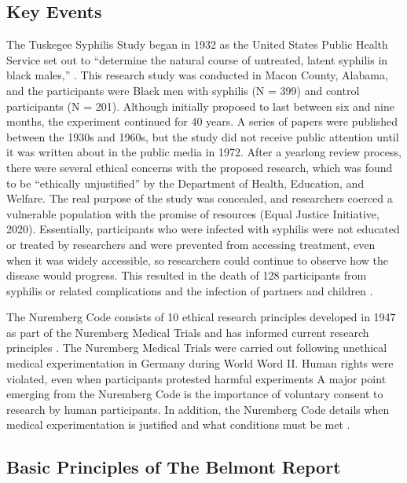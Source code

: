 \documentclass[
  11pt,
]{book}
\begin{document}
\subsection{Key Events}\label{key-events}

The Tuskegee Syphilis Study began in 1932 as the United States Public Health Service set out to ``determine the natural course of untreated, latent syphilis in black males,'' \citep[p.~21]{brandt_racism_1978}. This research study was conducted in Macon County, Alabama, and the participants were Black men with syphilis (N = 399) and control participants (N = 201). Although initially proposed to last between six and nine months, the experiment continued for 40 years. A series of papers were published between the 1930s and 1960s, but the study did not receive public attention until it was written about in the public media in 1972. After a yearlong review process, there were several ethical concerns with the proposed research, which was found to be ``ethically unjustified'' by the Department of Health, Education, and Welfare. The real purpose of the study was concealed, and researchers coerced a vulnerable population with the promise of resources (Equal Justice Initiative, 2020). Essentially, participants who were infected with syphilis were not educated or treated by researchers and were prevented from accessing treatment, even when it was widely accessible, so researchers could continue to observe how the disease would progress. This resulted in the death of 128 participants from syphilis or related complications and the infection of partners and children \citep{equal_justice_institute_tuskegee_2020}.

The Nuremberg Code consists of 10 ethical research principles developed in 1947 as part of the Nuremberg Medical Trials and has informed current research principles \citep{shuster_fifty_1997}. The Nuremberg Medical Trials were carried out following unethical medical experimentation in Germany during World Word II. Human rights were violated, even when participants protested harmful experiments \citep[see][for a detailed discussion]{gallin_nuremberg_2022} A major point emerging from the Nuremberg Code is the importance of voluntary consent to research by human participants. In addition, the Nuremberg Code details when medical experimentation is justified and what conditions must be met \citep{shuster_fifty_1997}.

\subsection{Basic Principles of The Belmont Report}\label{basic-principles-of-the-belmont-report}
\end{document}
